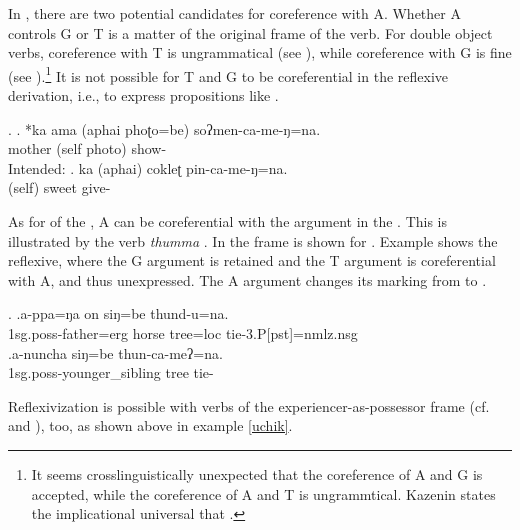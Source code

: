 In , there are two potential candidates for coreference with A. Whether A controls G or T is a matter of the original frame of the verb. For double object verbs, coreference with T is ungrammatical (see \Next[a]), while coreference with G is fine (see \Next[b]).\footnote{It seems crosslinguistically unexpected that the coreference of A and G is accepted, while the coreference of A and T is ungrammtical. Kazenin states the implicational universal that  \citep[918]{Kazenin2001_Verbal}. } It is not possible for T and G to be coreferential in the reflexive derivation, i.e., to express propositions like .

\ex. \ag. *ka ama (aphai phoʈo=be)  soʔmen-ca-me-ŋ=na.\\
 mother (self photo) show- \\
Intended: 
	\bg. ka (aphai) cokleʈ pin-ca-me-ŋ=na.\\
		 (self) sweet give-\\


As for  of the , A can be coreferential with the argument in the . This is illustrated by the verb \emph{thumma} .  In \Next[a] the  frame is shown for . Example \Next[b] shows the reflexive, where the  G argument is retained and the  T argument is coreferential with A, and thus unexpressed. The A argument changes its  marking from  to .  

\ex. \ag.a-ppa=ŋa on siŋ=be thund-u=na.\\
		{\sc 1sg.poss}-father{\sc =erg} horse tree{\sc =loc} tie{\sc -3.P[pst]=nmlz.nsg}\\
 	\bg.a-nuncha siŋ=be thun-ca-meʔ=na.\\
{\sc 1sg.poss}-younger\_sibling tree tie-\\


Reflexivization is possible with verbs of the experiencer-as-pos\-ses\-sor frame (cf.  and ), too, as shown above in example \ref{uchik}.


